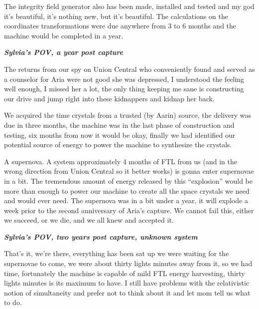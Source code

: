 \documentclass[colorlinks,12pt,a4paper]{book}
\begin{document}
 The integrity field generator also has been made, installed and tested and my god it's beautiful, it's nothing new, but 
 it's beautiful. The calculations on the coordinates transformations were due anywhere from 3 to 6 months and the 
 machine would be completed in a year.\par
 \bigskip
 
 \textit{\textbf{Sylvia's POV, a year post capture}}\par
 \bigskip
 
 The returns from our spy on Union Central who conveniently found and served as a counselor for Aria were not good she was 
 depressed, I understood the feeling well enough, I missed her a lot, the only thing keeping me sane is constructing our
  drive and jump right into these kidnappers and kidnap her back. \par
  \bigskip
 
 We acquired the time crystals from a trusted (by Aarin) source, the delivery was due in three months, 
 the machine was in the last phase of construction and testing, six months from now it would be okay, 
 finally we had identified our potential source of energy to power the machine to synthesize the crystals.\par
 \bigskip
 
 A supernova. A system approximately 4 months of FTL from us (and in the wrong direction from Union Central so it better 
 works) is gonna enter supernovae in a bit. The tremendous amount of energy released by this “explosion” would be more 
 than enough to power our machine to create all the space crystals we need and would ever need. The supernova was in 
 a bit under a year, it will explode a week prior to the second anniversary of Aria's capture. We cannot fail this, 
 either we succeed, or we die, and we all knew and accepted it.\par
 \bigskip
 
 
 \textit{\textbf{Sylvia's POV, two years post capture, unknown system}}\par
 \bigskip
 
 That's it, we're there, everything has been sat up we were waiting for the supernovae to come, we were about thirty lights 
 minutes away from it, so we had time, fortunately the machine is capable of mild FTL energy harvesting, thirty lights minutes is 
 its maximum to have. I still have problems with the relativistic notion of simultaneity and prefer not to think about it
  and let mom tell us what to do.\par
  \bigskip
 
\end{document}
